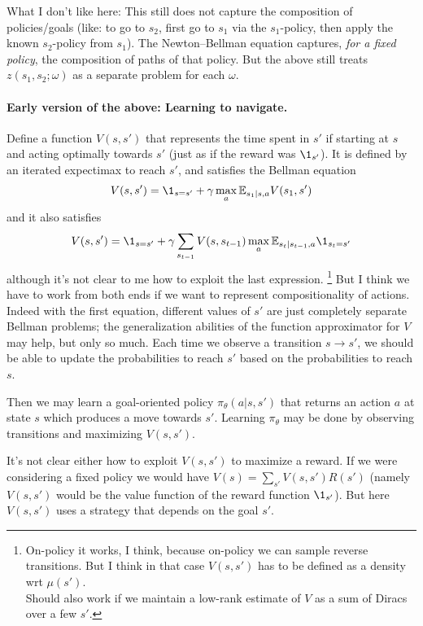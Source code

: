 \documentclass[11pt,a4paper]{article}
\begin{document}
What I don't like here: This still does not capture the composition of
policies/goals (like: to go to $s_2$, first go to $s_1$ via the
$s_1$-policy, then apply the known $s_2$-policy from $s_1$). The
Newton--Bellman equation captures, \emph{for a fixed policy}, the
composition of paths of that policy. But the above still treats
$z(s_1,s_2;\omega)$ as a separate problem for each $\omega$.

\paragraph{Early version of the above: Learning to navigate.} Define a function $V(s,s')$ that
represents the time spent in $s'$ if starting at $s$ and acting optimally
towards $s'$ (just as if the reward was $\1_{s'}$). It is defined by an iterated expectimax to reach $s'$, and
satisfies the Bellman equation
\begin{equation}
V(s,s')=\1_{s=s'}+\gamma \max_a \E_{s_1|s,a} V(s_1,s')
\end{equation}
and it also satisfies
\begin{equation}
V(s,s')=\1_{s=s'}+\gamma \sum_{s_{t-1}} V(s,s_{t-1})\max_a
\E_{s_t|s_{t-1},a}\1_{s_t=s'}
\end{equation}
although it's not clear to me how to exploit the last expression. 
\footnote{On-policy it works, I think, because on-policy we can sample
reverse transitions. But I think in that case $V(s,s')$ has to be defined
as a density wrt $\mu(s')$.\\Should also work if we maintain a low-rank
estimate of $V$ as a sum of Diracs over a few $s'$.}
But I
think we have to work from both ends if we want to represent
compositionality of actions. Indeed with the first equation, different values
of $s'$ are just completely separate Bellman problems; the generalization
abilities of the function approximator for $V$ may help, but only so
much. Each time we observe a transition $s\to s'$, we should be able to
update the probabilities to reach $s'$ based on the probabilities to
reach $s$.

Then we may learn a goal-oriented policy $\pi_\theta(a|s,s')$ that returns an
action $a$ at state $s$ which produces a move towards $s'$. Learning
$\pi_\theta$ may be done by observing transitions and maximizing
$V(s,s')$.

It's not clear either how to exploit $V(s,s')$ to maximize a reward. If
we were considering a fixed policy we would have
$V(s)=\sum_{s'}V(s,s')R(s')$ (namely $V(s,s')$ would be the value
function of the reward function $\1_{s'}$). But here $V(s,s')$ uses a
strategy that depends on the goal $s'$.
\end{document}
